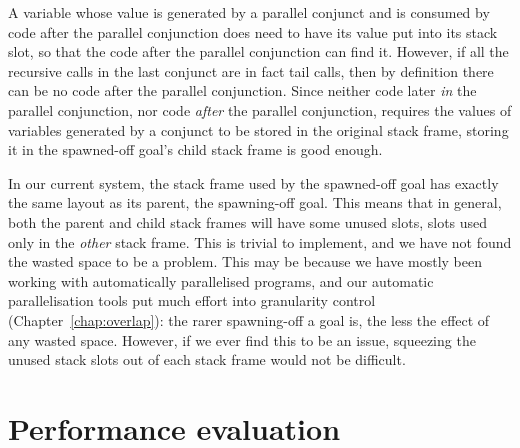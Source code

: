 A variable whose value is generated by a parallel conjunct
and is consumed by code after the parallel conjunction
does need to have its value put into its stack slot,
so that the code after the parallel conjunction can find it.
However, if all the recursive calls in the last conjunct
are in fact tail calls, then by definition
there can be no code after the parallel conjunction.
Since neither code later \emph{in} the parallel conjunction,
nor code \emph{after} the parallel conjunction,
requires the values of variables generated by a conjunct
to be stored in the original stack frame,
storing it in the spawned-off goal's child stack frame is good enough.

In our current system,
the stack frame used by the spawned-off goal
has exactly the same layout as its parent, the spawning-off goal.
This means that in general,
both the parent and child stack frames will have some unused slots,
slots used only in the \emph{other} stack frame.
This is trivial to implement,
and we have not found the wasted space to be a problem.
This may be because we have mostly been working with
automatically parallelised programs,
and our automatic parallelisation tools
put much effort into granularity control (Chapter~\ref{chap:overlap}):
the rarer spawning-off a goal is,
the less the effect of any wasted space.
However, if we ever find this to be an issue,
squeezing the unused stack slots out of each stack frame
would not be difficult.



\section{Performance evaluation}
\label{sec:lc_perf}



